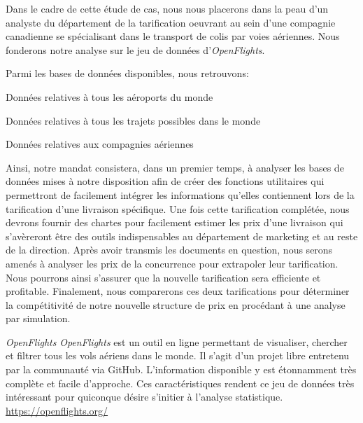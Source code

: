 Dans le cadre de cette étude de cas, nous nous placerons dans la peau d'un analyste du département de la tarification oeuvrant au sein d'une compagnie canadienne se spécialisant dans le transport de colis par voies aériennes. Nous fonderons notre analyse sur le jeu de données d'\emph{OpenFlights}. \cite{OpenFlightsData} 


Parmi les bases de données disponibles, nous retrouvons: \\

\begin{description}[style=multiline,leftmargin=2.5cm]
	\item[airports.dat] Données relatives à tous les aéroports du monde \cite{data:OpenFlights:routes}
	\item[routes.dat] Données relatives à tous les trajets possibles dans le monde \cite{data:OpenFlights:airports}
	\item[airlines.dat] Données relatives aux compagnies aériennes \cite{data:OpenFlights:airlines}
\end{description}

\vspace{\baselineskip}
Ainsi, notre mandat consistera, dans un premier temps, à analyser les bases de données mises à notre disposition afin de créer des fonctions utilitaires qui permettront de facilement intégrer les informations qu'elles contiennent lors de la tarification d'une livraison spécifique. Une fois cette tarification complétée, nous devrons fournir des chartes pour facilement estimer les prix d'une livraison qui s'avèreront être des outils indispensables au département de marketing et au reste de la direction. Après avoir transmis les documents en question, nous serons amenés à analyser les prix de la concurrence pour extrapoler leur tarification. Nous pourrons ainsi s'assurer que la nouvelle tarification sera efficiente et profitable. Finalement, nous comparerons ces deux tarifications pour déterminer la compétitivité de notre nouvelle structure de prix en procédant à une analyse par simulation. \\

\begin{moreInfo}{\emph{OpenFlights}}
	\emph{OpenFlights} est un outil en ligne permettant de visualiser, chercher et filtrer tous les vols aériens dans le monde. Il s’agit d’un projet libre entretenu par la communauté via GitHub. \cite{GitHub} L’information disponible y est étonnamment très complète et facile d’approche. Ces caractéristiques rendent ce jeu de données très intéressant pour quiconque désire s’initier à l’analyse statistique. \\
	\url{https://openflights.org/}
\end{moreInfo}


